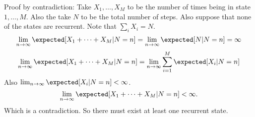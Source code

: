 Proof by contradiction:
Take $X_1, \dots, X_M$ to be the number of times being in state $1, \dots, M$. Also the take $N$ 
to be the total number of steps. Also suppose that none of the states are recurrent. Note that 
$\sum_iX_i = N$.
$$
\lim_{n\to\infty}\expected[X_1 + \dots + X_M | N = n] = \lim_{n\to\infty}\expected[N | N = n] = \infty
$$
$$
\lim_{n\to\infty}\expected[X_1 + \dots + X_M | N = n] = \lim_{n\to\infty}\sum_{i = 1}^M\expected[X_i | N = n] 
$$
Also $\lim_{n\to\infty}\expected[X_i | N = n] < \infty $.
$$
\lim_{n\to\infty}\expected[X_1 + \dots + X_M | N = n] < \infty.
$$
Which is a contradiction. So there must exist at least one recurrent state.
